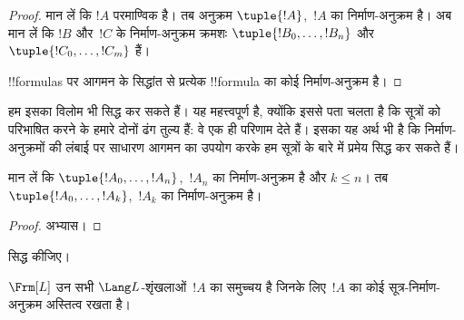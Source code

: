 \documentclass[../../../include/open-logic-section]{subfiles}
\begin{document}
\begin{proof}
मान लें कि $!A$ परमाण्विक है। तब अनुक्रम $\tuple{!A}$,~$!A$ का
निर्माण-अनुक्रम है।
%
अब मान लें कि $!B$ और~$!C$ के निर्माण-अनुक्रम क्रमशः
$\tuple{!B_0,\dotsc,!B_n}$ और $\tuple{!C_0,\dotsc,!C_m}$ हैं।
%
\begin{enumerate}
\end{enumerate}
!!{formula}s पर आगमन के सिद्धांत से प्रत्येक !!{formula} का कोई
निर्माण-अनुक्रम है।
\end{proof}

हम इसका विलोम भी सिद्ध कर सकते हैं। यह महत्त्वपूर्ण है, क्योंकि इससे पता
चलता है कि सूत्रों को परिभाषित करने के हमारे दोनों ढंग तुल्य हैं: वे एक ही
परिणाम देते हैं। इसका यह अर्थ भी है कि निर्माण-अनुक्रमों की लंबाई पर साधारण
आगमन का उपयोग करके हम सूत्रों के बारे में प्रमेय सिद्ध कर सकते हैं।

\begin{lem}
मान लें कि $\tuple{!A_0,\dotsc,!A_n}$,~$!A_n$ का निर्माण-अनुक्रम है और $k \leq n$।
तब $\tuple{!A_0,\dotsc,!A_k}$,~$!A_k$ का निर्माण-अनुक्रम है।
\end{lem}

\begin{proof}
अभ्यास।
\end{proof}

\begin{prob}
 सिद्ध कीजिए।
\end{prob}

\begin{thm}
$\Frm[L]$ उन सभी $\Lang L$-शृंखलाओं~$!A$ का समुच्चय है जिनके लिए~$!A$ का
कोई सूत्र-निर्माण-अनुक्रम अस्तित्व रखता है।
\end{thm}
\end{document}
